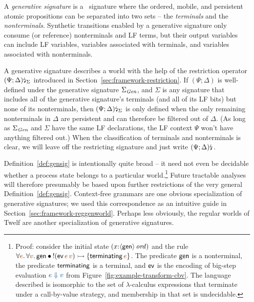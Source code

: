 \bigskip
\begin{definition}\label{def:gensig}
  A {\em generative signature} is a \sls~signature where the ordered,
  mobile, and persistent atomic propositions can be separated into two
  sets -- the {\em terminals} and the {\em nonterminals}. Synthetic
  transitions enabled by a generative signature only consume (or
  reference) nonterminals and LF terms, but their output variables can
  include LF variables, variables associated with terminals, and
  variables associated with nonterminals.
\end{definition}
\bigskip

\noindent
A generative signature describes a world with the help of the
restriction operator ${(\Psi; \Delta)}{\mbox{\lightning}}_{\Sigma}$ introduced
in Section~\ref{sec:framework-restriction}. If $(\Psi; \Delta)$ is
well-defined under the generative signature $\Sigma_{\it Gen}$, and
$\Sigma$ is any signature that includes all of the generative
signature's terminals (and all of its LF bits) but none of its
nonterminals, then ${(\Psi; \Delta)}{\mbox{\lightning}}_{\Sigma}$ is only
defined when the only remaining nonterminals in $\Delta$ are
persistent and can therefore be filtered out of $\Delta$. (As long as
$\Sigma_{\it Gen}$ and $\Sigma$ have the same LF declarations, the LF
context $\Psi$ won't have anything filtered out.) When the
classification of terminals and nonterminals is clear, we will leave
off the restricting signature and just write ${(\Psi;
  \Delta)}{\mbox{\lightning}}_{}$.

Definition~\ref{def:gensig} is intentionally quite broad -- it need
not even be decidable whether a process state belongs to a particular
world.\footnote{Proof: consider the initial state
  $(x{:}{\langle {\sf gen} \rangle}\,{{\it ord}})$ and the rule $\forall
  \lf{e}.\,\forall\lf{v}.\,{\sf gen} \fuse {!}({\sf
    ev}\,\lf{e}\,\lf{v}) \lefti \{ {\sf terminating}\,\lf{e} \}$. The
  predicate ${\sf gen}$ is a nonterminal, the predicate ${\sf
    terminating}$ is a terminal, and ${\sf ev}$ is the encoding of
  big-step evaluation $\obj{e \Downarrow v}$ from
  Figure~\ref{fig:example-transform-cbv}.  The language described is
  isomorphic to the set of $\lambda$-calculus expressions that terminate
  under a call-by-value strategy,
  and membership in that set is undecidable.} Future tractable
analyses will therefore presumably be based upon further restrictions
of the very general Definition~\ref{def:gensig}.  Context-free
grammars are one obvious specialization of generative signatures; we
used this correspondence as an intuitive guide in
Section~\ref{sec:framework-reggenworld}.  Perhaps less obviously,
the regular worlds of Twelf \cite{schurmann00automating} are another
specialization of generative signatures.


